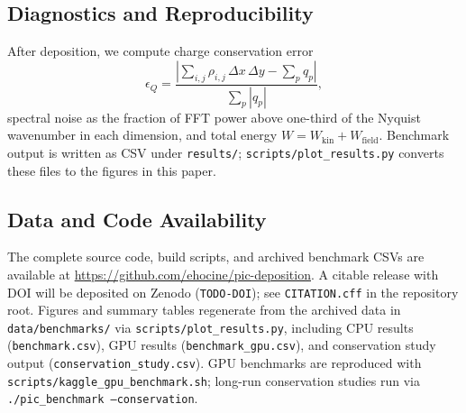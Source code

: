 \subsection{Diagnostics and Reproducibility}
After deposition, we compute charge conservation error
\begin{equation}
    \epsilon_Q = \frac{\left|\sum_{i,j}\rho_{i,j}\,\Delta x\,\Delta y - \sum_p q_p\right|}{\sum_p |q_p|},
\end{equation}
spectral noise as the fraction of FFT power above one-third of the Nyquist wavenumber in each dimension, and total energy $W = W_{\mathrm{kin}} + W_{\mathrm{field}}$.
Benchmark output is written as CSV under \texttt{results/}; \texttt{scripts/plot\_results.py} converts these files to the figures in this paper.

\subsection{Data and Code Availability}
The complete source code, build scripts, and archived benchmark CSVs are available at \url{https://github.com/ehocine/pic-deposition}.
A citable release with DOI will be deposited on Zenodo (\texttt{TODO-DOI}); see \texttt{CITATION.cff} in the repository root.
Figures and summary tables regenerate from the archived data in \texttt{data/benchmarks/} via \texttt{scripts/plot\_results.py}, including CPU results (\texttt{benchmark.csv}), GPU results (\texttt{benchmark\_gpu.csv}), and conservation study output (\texttt{conservation\_study.csv}).
GPU benchmarks are reproduced with \texttt{scripts/kaggle\_gpu\_benchmark.sh}; long-run conservation studies run via \texttt{./pic\_benchmark --conservation}.

